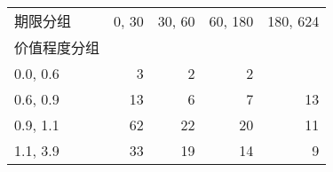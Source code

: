 \begin{tabular}{lrrrr}
\toprule
期限分组 &  0, 30 &  30, 60 &  60, 180 &  180, 624 \\
价值程度分组 &          &           &            &             \\
\midrule
0.0, 0.6    &        3 &         2 &          2 &             \\
0.6, 0.9    &       13 &         6 &          7 &          13 \\
0.9, 1.1    &       62 &        22 &         20 &          11 \\
1.1, 3.9    &       33 &        19 &         14 &           9 \\
\bottomrule
\end{tabular}
